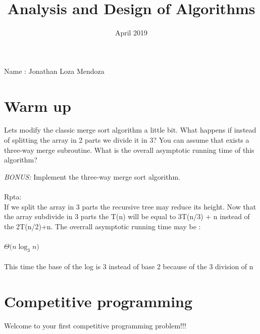 \documentclass[12pt]{article}
\title{Analysis and Design of Algorithms}
\author{}
\date{April 2019}
\begin{document}
\maketitle

Name : Jonathan Loza Mendoza\\
\section{Warm up}

Lets modify the classic merge sort algorithm a little bit. What happens if instead of splitting the array in 2 parts we divide it in 3? You can assume that exists a three-way merge subroutine. What is the overall asymptotic running time of this algorithm?

\emph{BONUS:} Implement the three-way merge sort algorithm.\\

    \\Rpta:\\
    If we split the array in 3 parts the recursive tree may reduce its height. Now that the array subdivide in 3 parts the T(n) will be equal to 3T(n/3) + n instead of the 2T(n/2)+n. The overrall asymptotic running time may be :\\
  \\$ {\Theta(n\log_3 n})$\\
   \\This time the base of the log is 3 instead of base 2 because of the 3 division of n

\section{Competitive programming}

Welcome to your first competitive programming problem!!! 
\end{document}
